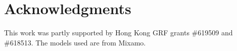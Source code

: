 \section*{Acknowledgments}

This work was partly supported by Hong Kong GRF grants
\#619509 and \#618513. The models used are from Mixamo.